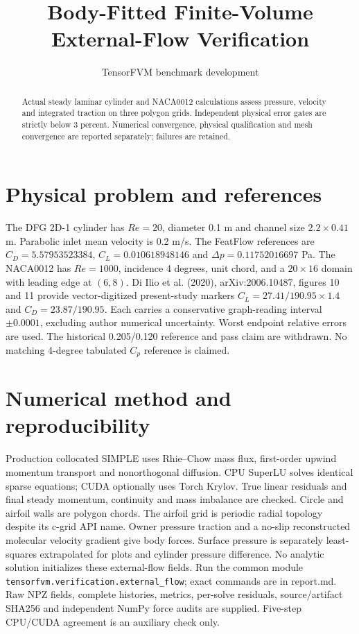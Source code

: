 \documentclass[11pt]{article}
\title{Body-Fitted Finite-Volume External-Flow Verification}
\author{TensorFVM benchmark development}
\begin{document}
\maketitle
\begin{abstract}
Actual steady laminar cylinder and NACA0012 calculations assess pressure, velocity and integrated traction on three polygon grids. Independent physical error gates are strictly below 3 percent. Numerical convergence, physical qualification and mesh convergence are reported separately; failures are retained.
\end{abstract}
\section{Physical problem and references}
The DFG 2D-1 cylinder has $Re=20$, diameter 0.1 m and channel size $2.2\times0.41$ m. Parabolic inlet mean velocity is 0.2 m/s. The FeatFlow references are $C_D=5.57953523384$, $C_L=0.010618948146$ and $\Delta p=0.11752016697$ Pa.
The NACA0012 has $Re=1000$, incidence 4 degrees, unit chord, and a $20\times16$ domain with leading edge at $(6,8)$.
Di Ilio et al. (2020), arXiv:2006.10487, figures 10 and 11 provide vector-digitized present-study markers $C_L=27.41/190.95\times1.4$ and $C_D=23.87/190.95$. Each carries a conservative graph-reading interval $\pm0.0001$, excluding author numerical uncertainty. Worst endpoint relative errors are used. The historical 0.205/0.120 reference and pass claim are withdrawn. No matching 4-degree tabulated $C_p$ reference is claimed.
\section{Numerical method and reproducibility}
Production collocated SIMPLE uses Rhie--Chow mass flux, first-order upwind momentum transport and nonorthogonal diffusion. CPU SuperLU solves identical sparse equations; CUDA optionally uses Torch Krylov. True linear residuals and final steady momentum, continuity and mass imbalance are checked. Circle and airfoil walls are polygon chords. The airfoil grid is periodic radial topology despite its c-grid API name. Owner pressure traction and a no-slip reconstructed molecular velocity gradient give body forces. Surface pressure is separately least-squares extrapolated for plots and cylinder pressure difference. No analytic solution initializes these external-flow fields.
Run the common module \texttt{tensorfvm.verification.external\_flow}; exact commands are in report.md. Raw NPZ fields, complete histories, metrics, per-solve residuals, source/artifact SHA256 and independent NumPy force audits are supplied. Five-step CPU/CUDA agreement is an auxiliary check only.
\end{document}
